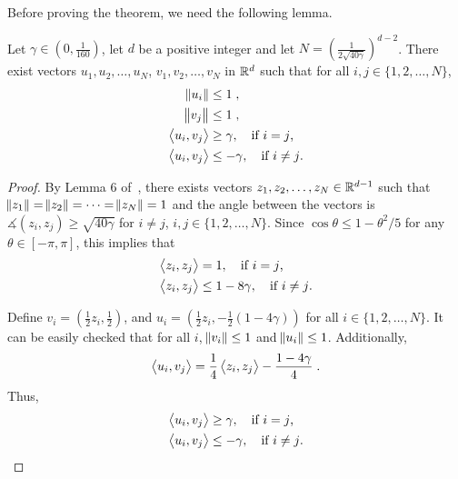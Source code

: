 Before proving the theorem, we need the following lemma.

\begin{lemma}
\label{lemma:embed_d_gamma}
Let $\gamma \in (0,\frac{1}{160})$, let $d$ be a positive integer and let $N = (\frac{1}{2\sqrt{40\gamma}})^{d-2}$.
There exist vectors $u_1, u_2, \dots, u_N$, $v_1, v_2, \dots, v_N$ in $\mathbb{R}^d$ such that for all $i, j \in \{1,2,\dots,N\}$,
\begin{align*}
\norm{u_i} & \le 1 \; , \\
\norm{v_j} & \le 1 \; , \\
\left\langle u_i, v_j \right\rangle & \ge \gamma, \quad \text{if $i=j$,} \\
\left\langle u_i, v_j \right\rangle & \le -\gamma, \quad \text{if $i \neq j$.}
\end{align*}
\end{lemma}

\begin{proof}
By Lemma 6 of~\citet{Long-1995}, there exists vectors $z_1, z_2, \dots, z_N \in
\mathbb{R}^{d-1}$ such that $\norm{z_1} = \norm{z_2} = \dots = \norm{z_N} = 1$ and the
angle between the vectors is $\measuredangle(z_i, z_j) \ge \sqrt{40 \gamma}$ for
$i \neq j$, $i,j \in \{1,2,\dots,N\}$. Since $\cos\theta \le 1-\theta^2/5$ for
any $\theta \in [-\pi,\pi]$, this implies that
\begin{align*}
\left\langle z_i, z_j \right\rangle &= 1, \quad \text{if $i = j$,} \\
\left\langle z_i, z_j \right\rangle &\le 1 - 8\gamma, \quad \text{if $i \neq j$.}
\end{align*}

Define $v_i = (\frac{1}{2} z_i, \frac{1}{2})$, and $u_i = (\frac{1}{2} z_i,
-\frac{1}{2}(1-4\gamma))$ for all $i \in \{1,2,\dots,N\}$. It can be easily
checked that for all $i$, $\norm{v_i} \le 1$ and $\norm{u_i} \le 1$.
Additionally,
$$
\left\langle u_i, v_j \right\rangle = \frac{1}{4} \left\langle z_i, z_j \right\rangle - \frac {1-4\gamma} 4 \; .
$$
Thus,
\begin{align*}
\left\langle u_i, v_j \right\rangle &\ge \gamma, \quad \text{if $i=j$,} \\
\left\langle u_i, v_j \right\rangle &\le -\gamma, \quad \text{if $i \neq j$.}
\end{align*}
\end{proof}

